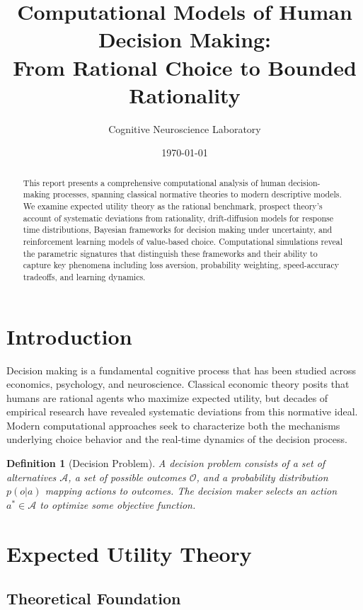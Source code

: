 \documentclass[a4paper, 11pt]{article}
\title{Computational Models of Human Decision Making:\\
From Rational Choice to Bounded Rationality}
\author{Cognitive Neuroscience Laboratory}
\date{\today}
\newtheorem{definition}{Definition}[section]
\begin{document}
\maketitle

\begin{abstract}
This report presents a comprehensive computational analysis of human decision-making processes,
spanning classical normative theories to modern descriptive models. We examine expected utility
theory as the rational benchmark, prospect theory's account of systematic deviations from
rationality, drift-diffusion models for response time distributions, Bayesian frameworks for
decision making under uncertainty, and reinforcement learning models of value-based choice.
Computational simulations reveal the parametric signatures that distinguish these frameworks
and their ability to capture key phenomena including loss aversion, probability weighting,
speed-accuracy tradeoffs, and learning dynamics.
\end{abstract}

\section{Introduction}

Decision making is a fundamental cognitive process that has been studied across economics,
psychology, and neuroscience. Classical economic theory posits that humans are rational agents
who maximize expected utility, but decades of empirical research have revealed systematic
deviations from this normative ideal. Modern computational approaches seek to characterize
both the mechanisms underlying choice behavior and the real-time dynamics of the decision process.

\begin{definition}[Decision Problem]
A decision problem consists of a set of alternatives $\mathcal{A}$, a set of possible outcomes
$\mathcal{O}$, and a probability distribution $p(o|a)$ mapping actions to outcomes. The decision
maker selects an action $a^* \in \mathcal{A}$ to optimize some objective function.
\end{definition}

\section{Expected Utility Theory}

\subsection{Theoretical Foundation}
\end{document}
